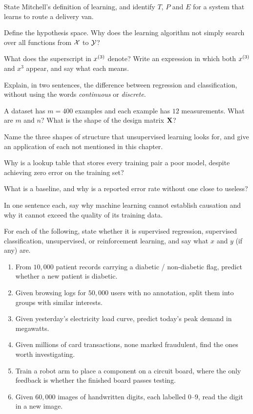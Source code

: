 \sq State Mitchell's definition of learning, and identify $T$, $P$ and $E$ for a
system that learns to route a delivery van.

\sq Define the hypothesis space. Why does the learning algorithm not simply
search over all functions from $\mathcal{X}$ to $\mathcal{Y}$?

\sq What does the superscript in $x^{(3)}$ denote? Write an expression in which
both $x^{(3)}$ and $x^3$ appear, and say what each means.

\sq Explain, in two sentences, the difference between regression and
classification, without using the words \emph{continuous} or \emph{discrete}.

\sq A dataset has $m = 400$ examples and each example has $12$ measurements.
What are $m$ and $n$? What is the shape of the design matrix $\mathbf{X}$?

\sq Name the three shapes of structure that unsupervised learning looks for, and
give an application of each not mentioned in this chapter.

\sq Why is a lookup table that stores every training pair a poor model, despite
achieving zero error on the training set?

\sq What is a baseline, and why is a reported error rate without one close to
useless?

\sq In one sentence each, say why machine learning cannot establish causation
and why it cannot exceed the quality of its training data.


\ap For each of the following, state whether it is supervised regression,
supervised classification, unsupervised, or reinforcement learning, and say what
$x$ and $y$ (if any) are.
\begin{enumerate}[label=(\alph*)]
  \item From $10{,}000$ patient records carrying a diabetic / non-diabetic flag,
        predict whether a new patient is diabetic.
  \item Given browsing logs for $50{,}000$ users with no annotation, split them
        into groups with similar interests.
  \item Given yesterday's electricity load curve, predict today's peak demand in
        megawatts.
  \item Given millions of card transactions, none marked fraudulent, find the
        ones worth investigating.
  \item Train a robot arm to place a component on a circuit board, where the only
        feedback is whether the finished board passes testing.
  \item Given $60{,}000$ images of handwritten digits, each labelled $0$--$9$,
        read the digit in a new image.
\end{enumerate}

